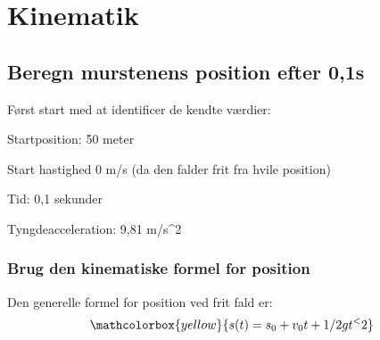\section{Kinematik}
\subsection{Beregn murstenens position efter 0,1s}
Først start med at identificer de kendte værdier:
\item Startposition: 50 meter
\item Start hastighed 0 m/s (da den falder frit fra hvile position)
\item Tid: 0,1 sekunder
\item Tyngdeacceleration: 9,81 m/s^2 

\subsubsection{Brug den kinematiske formel for position}
Den generelle formel for position ved frit fald er:
\begin{equation*}
    \mathcolorbox{yellow}{s(t)=s_0+v_0t+1/2gt^<{2}}
\end{equation*}